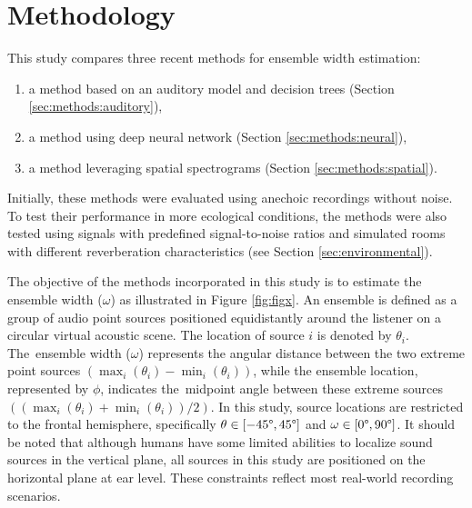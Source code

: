 \section{Methodology}

This study compares three recent methods for ensemble width estimation:
\begin{enumerate}
    \item a method based on an auditory model and decision trees (Section \ref{sec:methods:auditory}),
    \item a method using deep neural network (Section \ref{sec:methods:neural}),
    \item a method leveraging spatial spectrograms (Section \ref{sec:methods:spatial}).
\end{enumerate}
Initially, these methods were evaluated using anechoic recordings without noise. To test their performance in more ecological conditions, the methods were also tested using signals with predefined signal-to-noise ratios and simulated rooms with different reverberation characteristics (see Section \ref{sec:environmental}).

The objective of the methods incorporated in this study is to estimate the ensemble width ($\omega$) as illustrated in Figure \ref{fig:figx}. An ensemble is defined as a group of audio point sources positioned equidistantly around the listener on a circular virtual acoustic scene. The location of source $i$ is denoted by $\theta_i$. The~ensemble width ($\omega$) represents the angular distance between the two extreme point sources $(\max_i(\theta_i) - \min_i(\theta_i))$, while the ensemble location, represented by $\phi$, indicates the~midpoint angle between these extreme sources $((\max_i(\theta_i) + \min_i(\theta_i)) / 2)$. In this study, source locations are restricted to the frontal hemisphere, specifically $\theta \in [-45\degree, 45\degree]$ and $\omega \in [0\degree, 90\degree]$. It should be noted that although humans have some limited abilities to localize sound sources in the vertical plane, all sources in this study are positioned on the horizontal plane at ear level. These constraints reflect most real-world recording scenarios.





